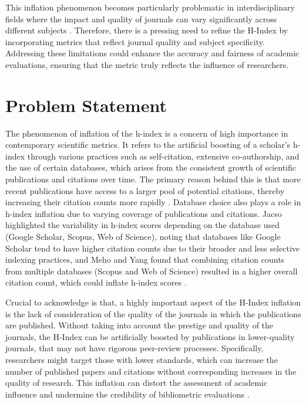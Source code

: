 This inflation phenomenon becomes particularly problematic in interdisciplinary
fields where the impact and quality of journals can vary significantly across
different subjects \cite{hirsch2005index,waltman2012inconsistency}. Therefore,
there is a pressing need to refine the H-Index by incorporating metrics that
reflect journal quality and subject specificity. Addressing these limitations
could enhance the accuracy and fairness of academic evaluations, ensuring that
the metric truly reflects the influence of researchers.

\section{Problem Statement}
The phenomenon of inflation of the h-index is a concern of high importance in
contemporary scientific metrics. It refers to the artificial boosting of a
scholar's h-index through various practices such as self-citation, extensive
co-authorship, and the use of certain databases, which arises from the
consistent growth of scientific publications and citations over time. The
primary reason behind this is that more recent publications have access to a
larger pool of potential citations, thereby increasing their citation counts
more rapidly \cite{norris2010h, koltun2021h, bi2023four}. Database choice also
plays a role in h-index inflation due to varying coverage of publications and
citations. Jacso highlighted the variability in h-index scores depending on the
database used (Google Scholar, Scopus, Web of Science), noting that databases
like Google Scholar tend to have higher citation counts due to their broader
and less selective indexing practices, and Meho and Yang found that combining
citation counts from multiple databases (Scopus and Web of Science) resulted in
a higher overall citation count, which could inflate h-index scores
\cite{norris2010h}.

Crucial to acknowledge is that, a highly important aspect of the H-Index
inflation is the lack of consideration of the quality of the journals in which
the publications are published. Without taking into account the prestige and
quality of the journals, the H-Index can be artificially boosted by
publications in lower-quality journals, that may not have rigorous peer-review
processes. Specifically, researchers might target those with lower standards,
which can increase the number of published papers and citations without
corresponding increases in the quality of research. This inflation can distort
the assessment of academic influence and undermine the credibility of
bibliometric evaluations \cite{tonta2020monetary}.

